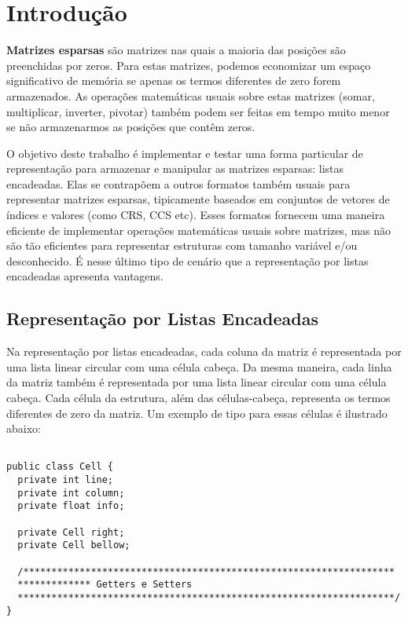 \documentclass[a4paper,10pt]{article}
\begin{document}
\section*{Introdução}

\textbf{Matrizes esparsas} são matrizes nas quais a maioria das posições são preenchidas por zeros. Para estas matrizes, podemos economizar um espaço significativo de memória se apenas os termos diferentes de zero forem armazenados. As operações matemáticas usuais sobre estas matrizes (somar, multiplicar, inverter, pivotar) também podem ser feitas em tempo muito menor se não armazenarmos as posições que contêm zeros.

O objetivo deste trabalho é implementar e testar uma forma particular de representação para armazenar e manipular as matrizes esparsas: listas encadeadas. Elas se contrapõem a outros formatos também usuais para representar matrizes esparsas, tipicamente baseados em conjuntos de vetores de índices e valores (como CRS, CCS etc). Esses formatos fornecem uma maneira eficiente de implementar operações matemáticas usuais sobre matrizes, mas não são tão eficientes para representar estruturas com tamanho variável e/ou desconhecido. É nesse último tipo de cenário que a representação por listas encadeadas apresenta vantagens.

\subsection*{Representação por Listas Encadeadas}

Na representação por listas encadeadas, cada coluna da matriz é representada por uma lista linear circular com uma célula cabeça. Da mesma maneira, cada linha da matriz também é representada por uma lista linear circular com uma célula cabeça. Cada célula da estrutura, além das células-cabeça, representa os termos diferentes de zero da matriz. Um exemplo de tipo para essas células é ilustrado abaixo:

\begin{verbatim}

public class Cell {
  private int line;
  private int column;
  private float info;
  
  private Cell right;
  private Cell bellow;
  
  /******************************************************************
  ************* Getters e Setters
  *******************************************************************/
}

\end{verbatim}
\end{document}
